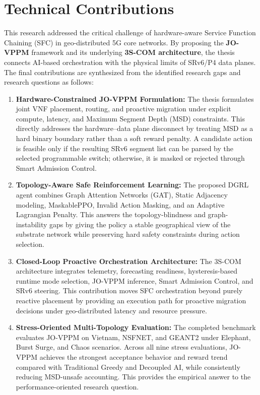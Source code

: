 \documentclass[12pt, a4paper, reqno, oneside]{book}
\begin{document}
\section{Technical Contributions}
This research addressed the critical challenge of hardware-aware Service Function Chaining (SFC) in geo-distributed 5G core networks. By proposing the \textbf{JO-VPPM} framework and its underlying \textbf{3S-COM architecture}, the thesis connects AI-based orchestration with the physical limits of SRv6/P4 data planes. The final contributions are synthesized from the identified research gaps and research questions as follows:
\begin{enumerate}
    \item \textbf{Hardware-Constrained JO-VPPM Formulation:} The thesis formulates joint VNF placement, routing, and proactive migration under explicit compute, latency, and Maximum Segment Depth (MSD) constraints. This directly addresses the hardware--data plane disconnect by treating MSD as a hard binary boundary rather than a soft reward penalty. A candidate action is feasible only if the resulting SRv6 segment list can be parsed by the selected programmable switch; otherwise, it is masked or rejected through Smart Admission Control.
    \item \textbf{Topology-Aware Safe Reinforcement Learning:} The proposed DGRL agent combines Graph Attention Networks (GAT), Static Adjacency modeling, MaskablePPO, Invalid Action Masking, and an Adaptive Lagrangian Penalty. This answers the topology-blindness and graph-instability gaps by giving the policy a stable geographical view of the substrate network while preserving hard safety constraints during action selection.
    \item \textbf{Closed-Loop Proactive Orchestration Architecture:} The 3S-COM architecture integrates telemetry, forecasting readiness, hysteresis-based runtime mode selection, JO-VPPM inference, Smart Admission Control, and SRv6 steering. This contribution moves SFC orchestration beyond purely reactive placement by providing an execution path for proactive migration decisions under geo-distributed latency and resource pressure.
    \item \textbf{Stress-Oriented Multi-Topology Evaluation:} The completed benchmark evaluates JO-VPPM on Vietnam, NSFNET, and GEANT2 under Elephant, Burst Surge, and Chaos scenarios. Across all nine stress evaluations, JO-VPPM achieves the strongest acceptance behavior and reward trend compared with Traditional Greedy and Decoupled AI, while consistently reducing MSD-unsafe accounting. This provides the empirical answer to the performance-oriented research question.

\end{enumerate}
\end{document}
